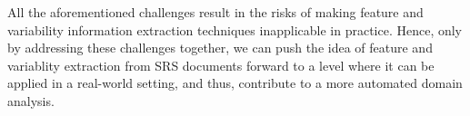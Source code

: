 \documentclass[graybox]{svmult}
\begin{document}
All the aforementioned challenges result in the risks of making feature and variability information extraction techniques inapplicable in practice. Hence, only by addressing these challenges together, we can push the idea of feature and variablity extraction from SRS documents forward to a level where it can be applied in a real-world setting, and thus, contribute to a more automated domain analysis.  





 
\end{document}
